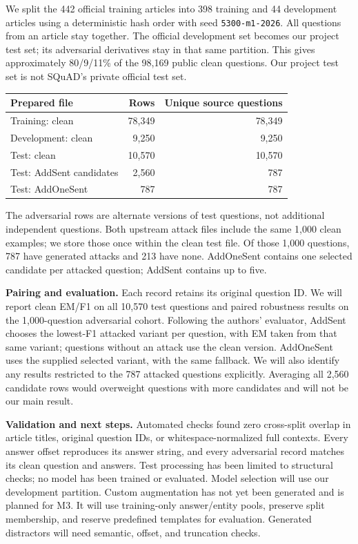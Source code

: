 \documentclass[11pt,letterpaper]{article}
\begin{document}
We split the 442 official training articles into 398 training and 44 development articles using a deterministic hash order with seed \texttt{5300-m1-2026}. All questions from an article stay together. The official development set becomes our project test set; its adversarial derivatives stay in that same partition. This gives approximately 80/9/11\% of the 98,169 public clean questions. Our project test set is not SQuAD's private official test set.

\begin{center}
\begin{tabular}{@{}lrr@{}}
\toprule
\textbf{Prepared file} & \textbf{Rows} & \textbf{Unique source questions}\\
\midrule
Training: clean & 78,349 & 78,349\\
Development: clean & 9,250 & 9,250\\
Test: clean & 10,570 & 10,570\\
Test: AddSent candidates & 2,560 & 787\\
Test: AddOneSent & 787 & 787\\
\bottomrule
\end{tabular}
\end{center}
\vspace{-5pt}
The adversarial rows are alternate versions of test questions, not additional independent questions. Both upstream attack files include the same 1,000 clean examples; we store those once within the clean test file. Of those 1,000 questions, 787 have generated attacks and 213 have none. AddOneSent contains one selected candidate per attacked question; AddSent contains up to five.

\textbf{Pairing and evaluation.}
Each record retains its original question ID. We will report clean EM/F1 on all 10,570 test questions and paired robustness results on the 1,000-question adversarial cohort. Following the authors' evaluator, AddSent chooses the lowest-F1 attacked variant per question, with EM taken from that same variant; questions without an attack use the clean version. AddOneSent uses the supplied selected variant, with the same fallback. We will also identify any results restricted to the 787 attacked questions explicitly. Averaging all 2,560 candidate rows would overweight questions with more candidates and will not be our main result.

\textbf{Validation and next steps.}
Automated checks found zero cross-split overlap in article titles, original question IDs, or whitespace-normalized full contexts. Every answer offset reproduces its answer string, and every adversarial record matches its clean question and answers. Test processing has been limited to structural checks; no model has been trained or evaluated. Model selection will use our development partition. Custom augmentation has not yet been generated and is planned for M3. It will use training-only answer/entity pools, preserve split membership, and reserve predefined templates for evaluation. Generated distractors will need semantic, offset, and truncation checks.
\end{document}
